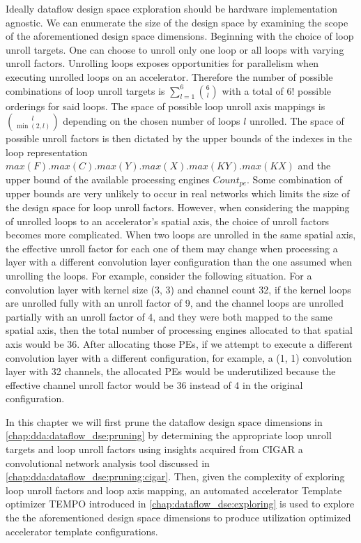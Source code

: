 Ideally dataflow design space exploration should be hardware implementation
agnostic. We can enumerate the size of the design space by examining the scope
of the aforementioned design space dimensions. Beginning with the choice of loop
unroll targets. One can choose to unroll only one loop or all loops with
varying unroll factors. Unrolling loops exposes opportunities for parallelism
when executing unrolled loops on an accelerator. Therefore the number of
possible combinations of loop unroll targets is
$\sum\limits_{l=1}^{6}\binom{6}{l}$ with a total of $6!$ possible orderings for
said loops. The space of possible loop unroll axis mappings is $\binom{l}{\min(2,
l)}$ depending on the chosen number of loops $l$ unrolled. The space of possible
unroll factors is then dictated by the upper bounds of the indexes in the loop
representation $max(F).max(C).max(Y).max(X).max(KY).max(KX)$ and the upper bound
of the available processing engines $Count_{pe}$. Some combination of upper
bounds are very unlikely to occur in real networks which limits the size of the
design space for loop unroll factors. However, when considering the
mapping of unrolled loops to an accelerator's spatial axis, the choice of unroll
factors becomes more complicated. When two loops are unrolled in the same
spatial axis, the effective unroll factor for each one of them may change when
processing a layer with a different convolution layer configuration than the one
assumed when unrolling the loops. For example, consider the following situation.
For a convolution layer with kernel size (3, 3) and channel count 32, if the kernel
loops are unrolled fully with an unroll factor of 9, and the channel loops are
unrolled partially with an unroll factor of 4, and they were both mapped to the
same spatial axis, then the total number of processing engines allocated to that
spatial axis would be 36. After allocating those PEs, if we attempt to execute a
different convolution layer with a different configuration, for example, a (1, 1)
convolution layer with 32 channels, the allocated PEs would be underutilized because
the effective channel unroll factor would be 36 instead of 4 in the original
configuration.

In this chapter we will first prune the dataflow design space dimensions in
\autoref{chap:dda:dataflow_dse:pruning} by determining the appropriate
loop unroll targets and loop unroll factors using insights acquired from
\ac{CIGAR} a convolutional network analysis tool discussed in
\autoref{chap:dda:dataflow_dse:pruning:cigar}. Then, given the complexity of
exploring loop unroll factors and loop axis mapping, an automated accelerator
Template optimizer TEMPO introduced in \autoref{chap:dataflow_dse:exploring} is
used to explore the the aforementioned design space dimensions to produce
utilization optimized accelerator template configurations. 

